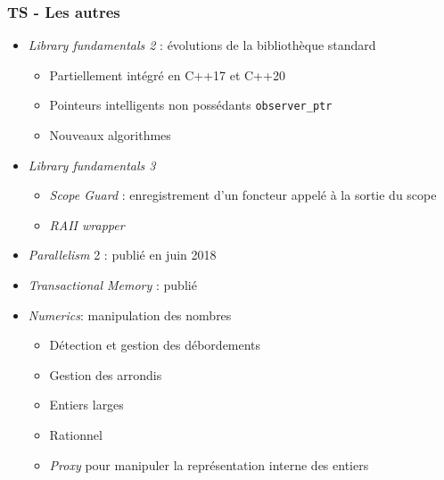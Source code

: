 \documentclass[C++.tex]{subfiles}
\begin{document}
\begin{frame}[fragile]
	\frametitle{TS - Les autres}
	\begin{itemize}
		\item \textit{Library fundamentals 2} : évolutions de la bibliothèque standard
		\begin{itemize}
			\item Partiellement intégré en C++17 et C++20
			\item Pointeurs intelligents non possédants \lstinline|observer_ptr|
			\item Nouveaux algorithmes
		\end{itemize}
		\item \textit{Library fundamentals 3}
		\begin{itemize}
			\item \textit{Scope Guard} : enregistrement d'un foncteur appelé à la sortie du scope
			\item \textit{RAII wrapper}
		\end{itemize}
		\item \textit{Parallelism} 2 : publié en juin 2018
		\item \textit{Transactional Memory} : publié
		\item \textit{Numerics}: manipulation des nombres
		\begin{itemize}
			\item Détection et gestion des débordements
			\item Gestion des arrondis
			\item Entiers larges
			\item Rationnel
			\item \textit{Proxy} pour manipuler la représentation interne des entiers
		\end{itemize}
	\end{itemize}
\end{frame}
\end{document}
